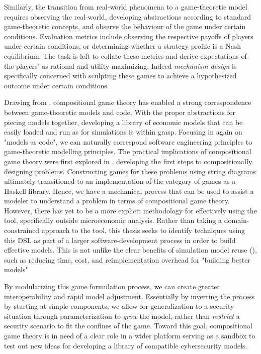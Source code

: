 \documentclass[11pt,titlepage,dvipsnames,table,xcdraw,english]{article}
\begin{document}
Similarly, the transition from real-world phenomena to a game-theoretic model requires observing the real-world, developing abstractions according to standard game-theoretic concepts, and observe the behaviour of the game under certain conditions. Evaluation metrics include observing the respective payoffs of players under certain conditions, or determining whether a strategy profile is a Nash equilibrium. The task is left to collate these metrics and derive expectations of the players' as rational and utility-maximizing. Indeed \textit{mechanism design} is specifically concerned with sculpting these games to achieve a hypothesized outcome under certain conditions. 

Drawing from \cite{Zahn2024}, compositional game theory has enabled a strong correspondence between game-theoretic models and code. With the proper abstractions for piecing models together, developing a library of economic models that can be easily loaded and run as for simulations is within grasp. Focusing in again on "models as code", we can naturally correspond software engineering principles to game-theoretic modelling principles. The practical implications of compositional game theory were first explored in \cite[section 2.3.12]{HedgesThesis}, developing the first steps to compositionally designing problems. Constructing games for these problems using string diagrams ultimately transitioned to an implementation of the category of games as a Haskell library. Hence, we have a mechanical process that can be used to assist a modeler to understand a problem in terms of compositional game theory. However, there has yet to be a more explicit methodology for effectively using the tool, specifically outside microeconomic analysis. Rather than taking a domain-constrained approach to the tool, this thesis seeks to identify techniques using this DSL as part of a larger software-development process in order to build effective models. This is not unlike the clear benefits of simulation model reuse (\cite{robinsonSimulationModelReuse2004}), such as reducing time, cost, and reimplementation overhead for "building better models"

By modularizing this game formulation process, we can create greater interoperability and rapid model adjustment. Essentially by inverting the process by starting at simple components, we allow for generalization to a security situation through parameterization to \textit{grow} the model, rather than \textit{restrict} a security scenario to fit the confines of the game. Toward this goal, compositional game theory is in need of a clear role in a wider platform serving as a sandbox to test out new ideas for developing a library of compatible cybersecurity models.
\end{document}
